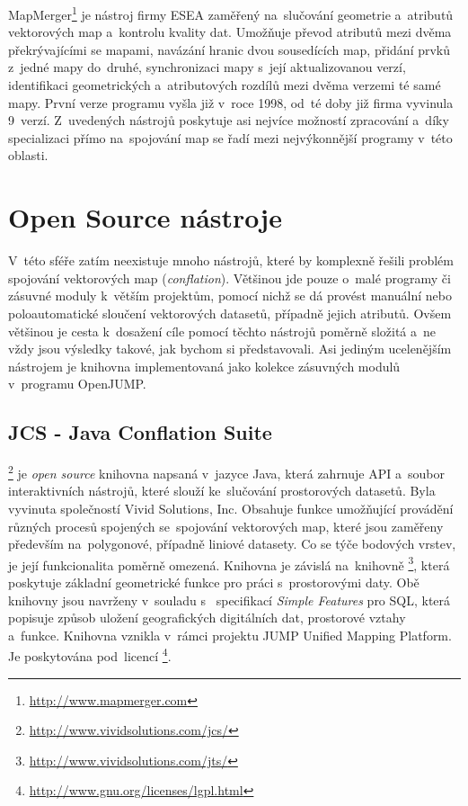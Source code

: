 MapMerger\footnote{\url{http://www.mapmerger.com}} je  nástroj firmy 
ESEA zaměřený na~slučování geometrie a~atributů vektorových map a~kontrolu 
kvality dat. Umožňuje převod atributů mezi dvěma překrývajícími se mapami, 
navázání hranic dvou sousedících map, přidání prvků z~jedné mapy do~druhé, 
synchronizaci mapy s~její aktualizovanou verzí, identifikaci geometrických 
a~atributových rozdílů mezi dvěma verzemi té samé mapy. První verze programu 
vyšla již v~roce 1998, od~té doby již firma vyvinula 9~verzí. Z~uvedených 
nástrojů poskytuje asi nejvíce možností zpracování a~díky specializaci 
přímo na~spojování map se řadí mezi nejvýkonnější programy v~této oblasti. 


\section{Open Source nástroje}
\label{open-source}

V~této sféře zatím neexistuje mnoho nástrojů, které by komplexně řešili problém
spojování vektorových map (\textit{conflation}). Většinou jde pouze o~malé 
programy či zásuvné moduly k~větším projektům, pomocí nichž se dá provést manuální
nebo poloautomatické sloučení vektorových datasetů, případně jejich atributů. 
Ovšem většinou je cesta k~dosažení cíle pomocí těchto nástrojů poměrně složitá 
a~ne vždy jsou výsledky takové, jak bychom si představovali. Asi jediným 
ucelenějším nástrojem je knihovna  implementovaná jako kolekce 
zásuvných modulů v~programu OpenJUMP.


\subsection{JCS - Java Conflation Suite}
\label{jcs}

\footnote{\url{http://www.vividsolutions.com/jcs/}} je \textit{open source}
knihovna napsaná v~jazyce Java, která zahrnuje API a~soubor interaktivních nástrojů, 
které slouží ke~slučování prostorových datasetů. Byla vyvinuta společností Vivid 
Solutions, Inc. Obsahuje funkce umožňující provádění různých procesů spojených 
se~spojování vektorových map, které jsou zaměřeny především na~polygonové, případně 
liniové datasety. Co se týče bodových vrstev, je její funkcionalita poměrně omezená. 
Knihovna  je závislá na~knihovně 
\footnote{\url{http://www.vividsolutions.com/jts/}}, která poskytuje 
základní geometrické funkce pro práci s~prostorovými daty. Obě knihovny jsou navrženy 
v~souladu s~ specifikací \textit{Simple Features} pro SQL,
která popisuje způsob uložení geografických digitálních dat, pro\-storové vztahy 
a~funkce. Knihovna  vznikla v~rámci projektu JUMP Unified Mapping Platform. Je 
poskytována pod~licencí 
\footnote{\url{http://www.gnu.org/licenses/lgpl.html}}.

